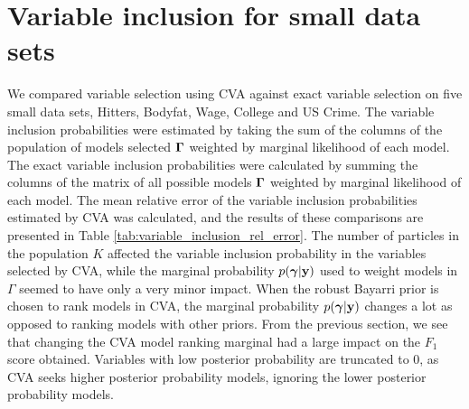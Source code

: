 \section{Variable inclusion for small data sets}

We compared variable selection using CVA against exact variable selection on five small data sets,
Hitters, Bodyfat, Wage, College and US Crime. 
The variable inclusion probabilities were estimated by taking the sum of the columns of the population
of models selected ${\boldsymbol \Gamma}$
weighted by marginal likelihood of each model.
The exact variable inclusion probabilities were calculated by summing the columns of the matrix of all possible
models ${\boldsymbol \Gamma}$ weighted by marginal likelihood of each model.
The mean relative error of the variable inclusion probabilities estimated by CVA was calculated,
and the results of these comparisons are presented in Table \ref{tab:variable_inclusion_rel_error}.
The number of particles in the population $K$ affected the
variable inclusion probability in the variables selected by CVA, while the marginal probability
$p({\boldsymbol \gamma} | {\bf y})$ used to weight models in $\Gamma$ seemed to have only a very minor impact.
When the robust Bayarri prior is chosen to rank models in CVA,
the marginal probability $p({\boldsymbol \gamma} | {\bf y})$ changes a lot as opposed to ranking models with other priors.
From the previous section, we see that changing the CVA model ranking
marginal had a large impact on the $F_1$ score obtained.
Variables with low posterior probability are truncated to 0, as CVA seeks higher posterior probability models,
ignoring the lower posterior probability models.

